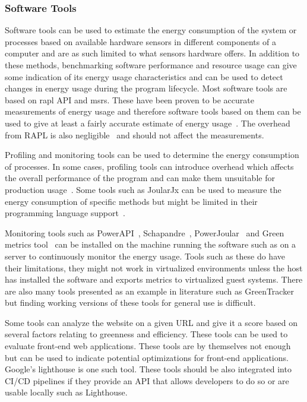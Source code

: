 \subsubsection{Software Tools}
Software tools can be used to estimate the energy consumption of the system or processes based on available hardware sensors in different components of a computer and are as such limited to what sensors hardware offers. In addition to these methods, benchmarking software performance and resource usage can give some indication of its energy usage characteristics and can be used to detect changes in energy usage during the program lifecycle. Most software tools are based on \gls{rapl} API and \gls{msr}s. These have been proven to be accurate measurements of energy usage and therefore software tools based on them can be used to give at least a fairly accurate estimate of energy usage~\cite{shortcodepathrapl}\cite{raplinaction}. The overhead from RAPL is also negligible~\cite{raplinaction} and should not affect the measurements.

Profiling and monitoring tools can be used to determine the energy consumption of processes. In some cases, profiling tools can introduce overhead which affects the overall performance of the program and can make them unsuitable for production usage~\cite{profilingenergyprofilers}\cite{calmenergyaccounting}. Some tools such as JoularJx can be used to measure the energy consumption of specific methods but might be limited in their programming language support~\cite{joularjx}.

Monitoring tools such as PowerAPI~\cite{powerapi}, Schapandre~\cite{scaphandre}, PowerJoular~\cite{joularjx} and Green metrics tool~\cite{greenmetricstool} can be installed on the machine running the software such as on a server to continuously monitor the energy usage. Tools such as these do have their limitations, they might not work in virtualized environments unless the host has installed the software and exports metrics to virtualized guest systems. There are also many tools presented as an example in literature such as GreenTracker~\cite{greentracker} but finding working versions of these tools for general use is difficult.

Some tools can analyze the website on a given URL and give it a score based on several factors relating to greenness and efficiency. These tools can be used to evaluate front-end web applications. These tools are by themselves not enough but can be used to indicate potential optimizations for front-end applications. Google's lighthouse is one such tool. These tools should be also integrated into CI/CD pipelines if they provide an API that allows developers to do so or are usable locally such as Lighthouse.

